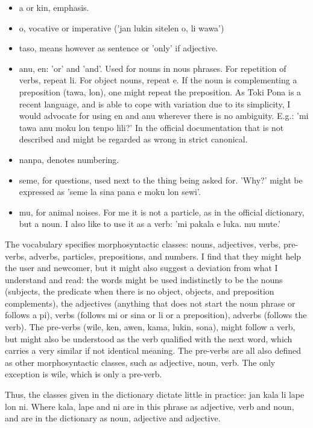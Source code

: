 \documentclass{article}
\begin{document}
\begin{itemize}
  \item a or kin, emphasis.
  \item o, vocative or imperative ('jan lukin sitelen o, li wawa')
  \item taso, means however as sentence or 'only' if adjective.
  \item anu, en: 'or' and 'and'. Used for nouns in nous phrases.
    For repetition of verbs, repeat li.
    For object nouns, repeat e.
    If the noun is complementing a preposition (tawa, lon),
    one might repeat the preposition.
    As Toki Pona is a recent language, and is able to cope with
    variation due to its simplicity, I would advocate for
    using en and anu wherever there is no ambiguity.
    E.g.: 'mi tawa anu moku lon tenpo lili?'
    In the official documentation that is not described and
    might be regarded as wrong in strict canonical.
  \item nanpa, denotes numbering.
  \item seme, for questions, used next to the thing being asked for.
    'Why?' might be expressed as
    'seme la sina pana e moku lon sewi'.
  \item mu, for animal noises. For me it is not a particle, as in the
    official dictionary, but a noun.
    I also like to use it as a verb:
    'mi pakala e luka. mu mute.'
\end{itemize}

The vocabulary specifies morphosyntactic classes:
nouns, adjectives, verbs, pre-verbs, adverbs, particles, prepositions, and numbers.
I find that they might help the user and newcomer, but
it might also suggest a deviation from what I understand and read:
the words might be used indistinctly to be the nouns
(subjects, the predicate when there is no object, objects,
and preposition complements),
the adjectives (anything that does not start the noun phrase or follows a pi),
verbs
(follows mi or sina or li or a preposition),
adverbs (follows the verb).
The pre-verbs (wile, ken, awen, kama, lukin, sona),
might follow a verb, but might also be understood
as the verb qualified with the next word,
which carries a very similar if not identical meaning.
The pre-verbs are all also defined as other morphosyntactic classes,
such as adjective, noun, verb.
The only exception is wile, which is only a pre-verb.

Thus, the classes given in the dictionary dictate little
in practice:
jan kala li lape lon ni.
Where kala, lape and ni are in this phrase
as adjective, verb and noun,
and are in the dictionary as noun,
adjective and adjective.
\end{document}
